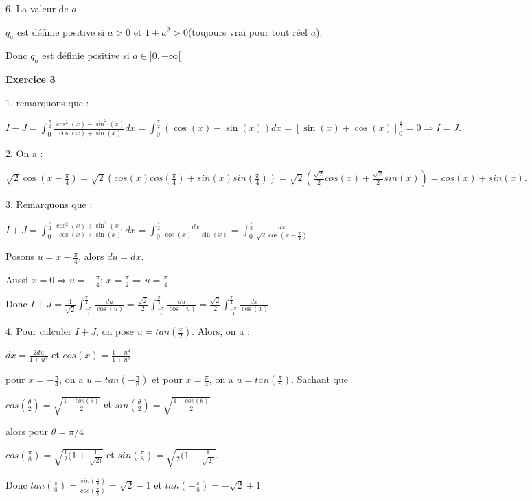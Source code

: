 \documentclass[12pt]{article}
\begin{document}
\begin{spacing}{1.5}
6. La valeur de $a$

$q_a$ est définie positive si $a>0$ et $1+a^2>0$(toujours vrai pour tout réel $a$).

Donc $q_a$ est définie positive si $a\in ]0,+\infty[$


\medskip\textbf{Exercice 3}

1. remarquons que :

$I-J=\int_{0}^{\frac{\pi}{2}}\frac{\cos^2(x)-\sin^2(x)}{\cos(x) + \sin(x)}dx=\int_{0}^{\frac{\pi}{2}}(\cos(x)-\sin(x))dx=[\sin(x)+\cos(x)]_0^{\frac{\pi}{2}}=0\Longrightarrow I=J$.

2. On a :

$\sqrt{2}\cos(x-\frac{\pi}{4})=\sqrt{2}(cos(x) cos(\frac{\pi}{4}) + sin(x) sin(\frac{\pi}{4}))=\sqrt{2}(\frac{\sqrt{2}}{2}cos(x)+\frac{\sqrt{2}}{2}sin(x))=cos(x)+sin(x)$.

3. Remarquons que :

$I+J=\int_{0}^{\frac{\pi}{2}}\frac{\cos^2(x)+\sin^2(x)}{\cos(x) + \sin(x)}dx=\int_{0}^{\frac{\pi}{2}}\frac{dx}{\cos(x) + \sin(x)}=\int_{0}^{\frac{\pi}{2}}\frac{dx}{\sqrt{2}\cos(x-\frac{\pi}{4})}$

Posons $u=x-\frac{\pi}{4}$, alors $du=dx$.

Aussi $x=0\Longrightarrow u=-\frac{\pi}{4}$; $x=\frac{\pi}{2}\Longrightarrow u=\frac{\pi}{4}$

Donc $I+J=\frac{1}{\sqrt{2}}\int_{\frac{-\pi}{4}}^{\frac{\pi}{4}}\frac{du}{\cos(u)}=\frac{\sqrt{2}}{2}\int_{\frac{-\pi}{4}}^{\frac{\pi}{4}}\frac{du}{\cos(u)}=\frac{\sqrt{2}}{2}\int_{\frac{-\pi}{4}}^{\frac{\pi}{4}}\frac{dx}{\cos(x)}$.

4.  Pour calculer $I + J$, on pose $u = tan(\frac{x}{2})$. Alors, on a :

$dx=\frac{2du}{1+u^2}$ et $cos(x)=\frac{1-u^2}{1+u^2}$

pour $x=-\frac{\pi}{4}$, on a $u=tan(-\frac{\pi}{8})$ et pour $x=\frac{\pi}{4}$, on a $u=tan(\frac{\pi}{8})$. Sachant que 

$cos(\frac{\theta}{2})=\sqrt{\frac{1+cos(\theta)}{2}}$ et $sin(\frac{\theta}{2})=\sqrt{\frac{1-cos(\theta)}{2}}$

alors pour $\theta=\pi/4$

$cos(\frac{\pi}{8})=\sqrt{\frac{1}{2}(1+\frac{1}{\sqrt{2)}}}$ et $sin(\frac{\pi}{8})=\sqrt{\frac{1}{2}(1-\frac{1}{\sqrt{2)}}}$.

Donc $tan(\frac{\pi}{8})=\frac{sin(\frac{\pi}{8})}{cos(\frac{\pi}{8})}=\sqrt{2}-1$ et $tan(-\frac{\pi}{8})=-\sqrt{2}+1$


\end{spacing}
\end{document}
